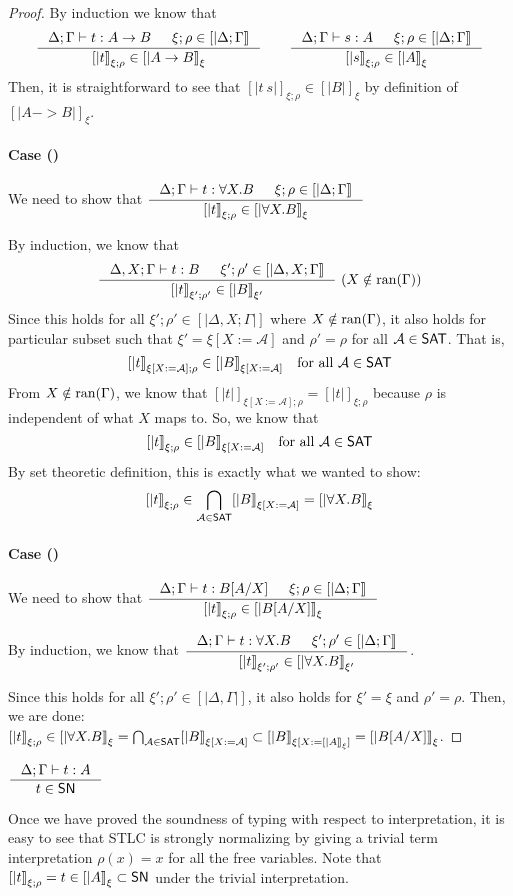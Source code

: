 \begin{proof}
By induction we know that
\[
\inference{\Delta;\Gamma |- t : A -> B & \xi;\rho\in[|\Delta;\Gamma|]}{[|t|]_{\xi;\rho} \in [|A -> B|]_\xi}
\qquad
\inference{\Delta;\Gamma |- s : A & \xi;\rho\in[|\Delta;\Gamma|]}{[|s|]_{\xi;\rho} \in [|A|]_\xi}
\]
Then, it is straightforward to see that $[|t~s|]_{\xi;\rho}\in[|B|]_\xi$
by definition of $[|A -> B|]_\xi$.

\paragraph{Case ()}
We need to show that
$ \inference{\Delta;\Gamma |- t : \forall X.B & \xi;\rho\in[|\Delta;\Gamma|]}
	{[|t|]_{\xi;\rho} \in [|\forall X.B|]_\xi} $

By induction, we know that
\[ \inference{\Delta,X;\Gamma |- t : B & \xi';\rho'\in[|\Delta,X;\Gamma|]}
	{[|t|]_{\xi';\rho'} \in [|B|]_{\xi'}} ~
	(X\notin\ran(\Gamma))
\]
Since this holds for all $\xi';\rho' \in [|\Delta,X;\Gamma|]$ where
$X\notin\mathop{\mathrm{ran}}(\Gamma)$, it also holds for particular subset such that
$\xi' = \xi[X:=\mathcal{A}]$ and $\rho'=\rho$ for all $\mathcal{A}\in\mathsf{SAT}$.
That is,
\[ [|t|]_{\xi[X:=\mathcal{A}];\rho} \in [|B|]_{\xi[X:=\mathcal{A}]}
   \quad \text{for all}~\mathcal{A}\in\mathsf{SAT} \]
From $X\notin\mathop{\mathrm{ran}}(\Gamma)$, we know that
$[|t|]_{\xi[X:=\mathcal{A}];\rho} = [|t|]_{\xi;\rho}$
because $\rho$ is independent of what $X$ maps to.
So, we know that
\[ [|t|]_{\xi;\rho} \in [|B|]_{\xi[X:=\mathcal{A}]}
	\quad \text{for all}~\mathcal{A}\in\mathsf{SAT} \]
By set theoretic definition, this is exactly what we wanted to show:
\[ [|t|]_{\xi;\rho} \in
	\bigcap_{\mathcal{A}\in\mathsf{SAT}} [|B|]_{\xi[X:=\mathcal{A}]}
	= [|\forall X.B|]_\xi
\]

\paragraph{Case ()}
We need to show that
$ \inference{\Delta;\Gamma |- t : B[A/X] & \xi;\rho\in[|\Delta;\Gamma|]}
	{[|t|]_{\xi;\rho} \in [|B[A/X]|]_\xi} $

By induction, we know that
$ \inference{\Delta;\Gamma |- t : \forall X.B & \xi';\rho'\in[|\Delta;\Gamma|]}
	{[|t|]_{\xi';\rho'} \in [|\forall X.B|]_{\xi'}}
$.

Since this holds for all $\xi';\rho' \in [|\Delta,\Gamma|]$,
it also holds for $\xi'=\xi$ and $\rho'=\rho$. Then, we are done:
$ [|t|]_{\xi;\rho} \in [|\forall X.B|]_{\xi}
	= \bigcap_{\mathcal{A}\in\mathsf{SAT}} [|B|]_{\xi[X:=\mathcal{A}]}
	\subset [|B|]_{\xi[X:=[|A|]_\xi]} = [|B[A/X]|]_\xi
$.
\end{proof}
\begin{corollary}
	$\inference{\Delta;\Gamma |- t : A}{t \in \SN}$
\end{corollary}
Once we have proved the soundness of typing with respect to interpretation,
it is easy to see that STLC is strongly normalizing by giving a trivial term
interpretation $\rho(x) = x$ for all the free variables.
Note that $[|t|]_{\xi;\rho} = t \in [|A|]_\xi \subset \mathsf{SN}$
under the trivial interpretation.

